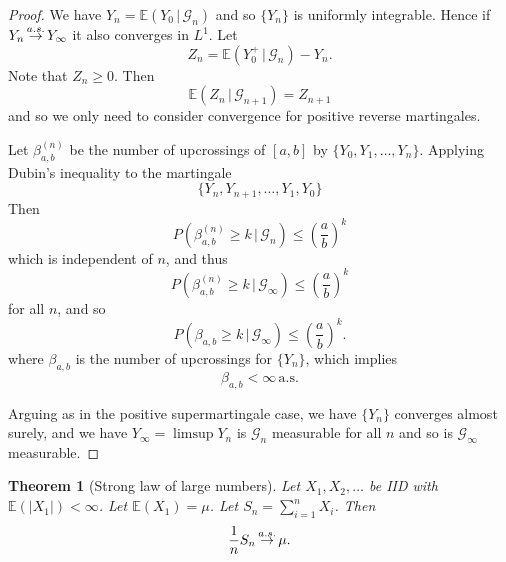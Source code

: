 \documentclass[10pt, oneside, reqno]{amsart}
\theoremstyle{plain}%
\newtheorem{thm}{Theorem}[section]
\theoremstyle{definition}
\theoremstyle{remark}
\newcommand{\given}{ \, | \,}
\newcommand{\E}{\mathbb{E}}
\def\cas{\,{\buildrel a.s. \over \rightarrow}\,}
\newcommand{\sigg}{\mathcal{G}}
\newcommand{\sumni}{\sum_{i=1}^n}
\begin{document}
\begin{proof}
    We have $Y_n = \E(Y_0 \given \sigg_n)$ and so $\{ Y_n \}$ is uniformly integrable.  Hence if $Y_n \cas Y_\infty$ it also converges in $L^1$.  Let \[
        Z_n = \E(Y_0^+ \given \sigg_n) - Y_n.
    \]  Note that $Z_n \geq 0$.  Then \[
        \E(Z_n \given \sigg_{n+1}) = Z_{n+1}
    \] and so we only need to consider convergence for positive reverse martingales.  
    
    Let $\beta_{a,b}^{(n)}$ be the number of upcrossings of $[a,b]$ by $\{ Y_0, Y_1, \dots, Y_n \}$.  Applying Dubin's inequality to the martingale \[
        \{ Y_n, Y_{n+1}, \dots, Y_{1}, Y_0 \}
    \] Then \[
        P(\beta_{a,b}^{(n)} \geq k \given \sigg_n) \leq \left( \frac{a}{b} \right)^k
    \] which is independent of $n$, and thus \[
        P(\beta_{a,b}^{(n)} \geq k \given \sigg_\infty) \leq \left( \frac{a}{b} \right)^k
    \] for all $n$, and so \[
        P(\beta_{a,b} \geq k \given \sigg_\infty) \leq \left( \frac{a}{b} \right)^k.
    \] where $\beta_{a,b}$ is the number of upcrossings for $\{ Y_n \}$, which implies \[
        \beta_{a,b} < \infty \, \text{a.s.}
    \] 
    
    Arguing as in the positive supermartingale case, we have $\{ Y_n \}$ converges almost surely, and we have $Y_\infty = \limsup Y_n$ is $\sigg_n$ measurable for all $n$ and so is $\sigg_\infty$ measurable.  
\end{proof}

\begin{thm}[Strong law of large numbers]
    Let $X_1, X_2, \dots$ be IID with $\E(|X_1|) < \infty$.  Let $\E(X_1) = \mu$.  Let $S_n = \sumni X_i$.  Then \[
        \frac{1}{n} S_n \cas \mu.
    \]
\end{thm}
\end{document}

